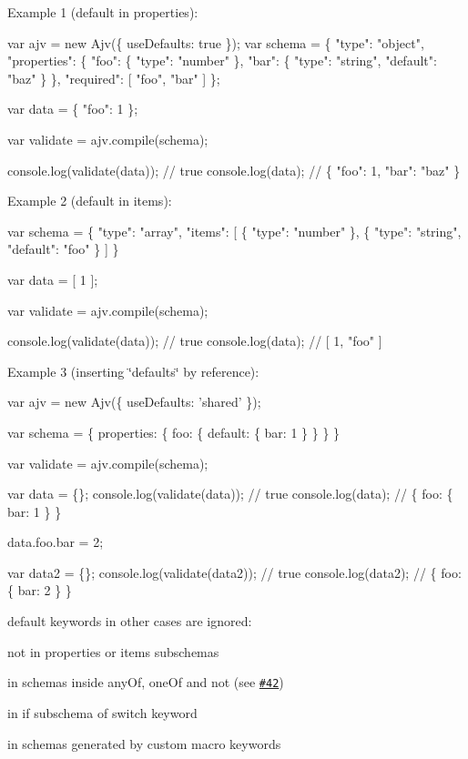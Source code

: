 Example 1 ({\ttfamily default} in {\ttfamily properties})\+:


\begin{DoxyCode}
var ajv = new Ajv(\{ useDefaults: true \});
var schema = \{
  "type": "object",
  "properties": \{
    "foo": \{ "type": "number" \},
    "bar": \{ "type": "string", "default": "baz" \}
  \},
  "required": [ "foo", "bar" ]
\};

var data = \{ "foo": 1 \};

var validate = ajv.compile(schema);

console.log(validate(data)); // true
console.log(data); // \{ "foo": 1, "bar": "baz" \}
\end{DoxyCode}


Example 2 ({\ttfamily default} in {\ttfamily items})\+:


\begin{DoxyCode}
var schema = \{
  "type": "array",
  "items": [
    \{ "type": "number" \},
    \{ "type": "string", "default": "foo" \}
  ]
\}

var data = [ 1 ];

var validate = ajv.compile(schema);

console.log(validate(data)); // true
console.log(data); // [ 1, "foo" ]
\end{DoxyCode}


Example 3 (inserting \char`\"{}defaults\char`\"{} by reference)\+:


\begin{DoxyCode}
var ajv = new Ajv(\{ useDefaults: 'shared' \});

var schema = \{
  properties: \{
    foo: \{
      default: \{ bar: 1 \}
    \}
  \}
\}

var validate = ajv.compile(schema);

var data = \{\};
console.log(validate(data)); // true
console.log(data); // \{ foo: \{ bar: 1 \} \}

data.foo.bar = 2;

var data2 = \{\};
console.log(validate(data2)); // true
console.log(data2); // \{ foo: \{ bar: 2 \} \}
\end{DoxyCode}


{\ttfamily default} keywords in other cases are ignored\+:


\begin{DoxyItemize}
\item not in {\ttfamily properties} or {\ttfamily items} subschemas
\item in schemas inside {\ttfamily any\+Of}, {\ttfamily one\+Of} and {\ttfamily not} (see \href{https://github.com/epoberezkin/ajv/issues/42}{\tt \#42})
\item in {\ttfamily if} subschema of {\ttfamily switch} keyword
\item in schemas generated by custom macro keywords
\end{DoxyItemize}

